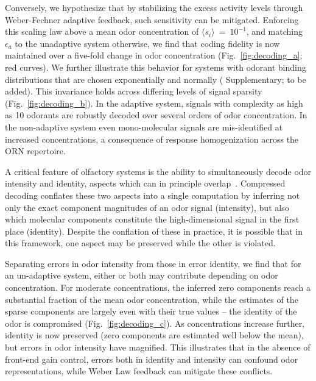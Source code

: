 Conversely, we hypothesize that by stabilizing the excess activity levels through Weber-Fechner adaptive feedback, such sensitivity can be mitigated. Enforcing this scaling law above a mean odor concentration of $\langle s_i \rangle~=~10^{-1}$, and matching $\epsilon_a$ to the unadaptive system otherwise, we find that coding fidelity is now maintained over a five-fold change in odor concentration (Fig.~\ref{fig:decoding_a}; red curves). We further illustrate this behavior for systems with odorant binding distributions that are chosen exponentially and normally ({\color{blue} Supplementary; to be added}). This invariance holds across differing levels of signal sparsity (Fig.~\ref{fig:decoding_b}). In the adaptive system, signals with complexity as high as 10 odorants are robustly decoded over several orders of odor concentration. In the non-adaptive system even mono-molecular signals are mis-identified at increased concentrations, a consequence of response homogenization across the ORN repertoire.


A critical feature of olfactory systems is the ability to simultaneously decode odor intensity and identity, aspects which can in principle overlap~\cite{intensity_vs_identity, segregation_intensity_identity}. Compressed decoding conflates these two aspects into a single computation by inferring not only the exact component magnitudes of an odor signal (intensity), but also which molecular components constitute the high-dimensional signal in the first place (identity). Despite the conflation of these in practice, it is possible that in this framework, one aspect may be preserved while the other is violated. 

Separating errors in odor intensity from those in error identity, we find that for an un-adaptive system, either or both may contribute depending on odor concentration. For moderate concentrations, the inferred zero components reach a substantial fraction of the mean odor concentration, while the estimates of the sparse components are largely even with their true values -- the identity of the odor is compromised (Fig.~\ref{fig:decoding_c}). As concentrations increase further, identity is now preserved (zero components are estimated well below the mean), but errors in odor intensity have magnified. This illustrates that in the absence of front-end gain control, errors both in identity and intensity can confound odor representations, while Weber Law feedback can mitigate these conflicts. 






